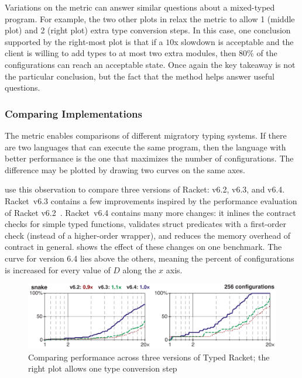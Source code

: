 Variations on the  metric can answer similar questions
 about a mixed-typed program.
For example, the two other plots in 
 relax the metric to allow 1 (middle plot) and 2 (right plot) extra type
 conversion steps.
In this case, one conclusion supported by the right-most plot is that
 if a $10$x slowdown is acceptable and the client is willing to add types
 to at most two extra modules, then 80\% of the configurations can reach
 an acceptable state.
Once again the key takeaway is not the particular conclusion,
 but the fact that the method helps answer useful questions.


\subsubsection{Comparing Implementations}

The  metric enables comparisons of different migratory
 typing systems.
If there are two languages that can execute the same program,
 then the language with better performance is the one that maximizes the
 number of  configurations.
The difference may be plotted by drawing two curves on the same
 axes.

\citet{gtnffvf-jfp-2019} use this observation to compare three versions
 of Racket: v6.2, v6.3, and v6.4.
Racket~v6.3 contains a few improvements inspired by the performance
 evaluation of Racket v6.2~\cite{tfgnvf-popl-2016}.
Racket~v6.4 contains many more changes:
 it inlines the contract checks for simple typed functions,
 validates struct predicates with a first-order check (instead of a higher-order wrapper),
 and reduces the memory overhead of contract in general.
 shows the effect of these changes on one benchmark.
The curve for version 6.4 lies above the others, meaning the percent of
  configurations is increased for every value of $D$ along
 the $x$ axis.

\begin{figure}[ht]
\includegraphics[width=0.8\columnwidth]{src/snake-jfp.png}
\caption{Comparing performance across three versions of Typed Racket; the right plot allows one type conversion step}
\label{fig:snake-jfp}
\end{figure}


